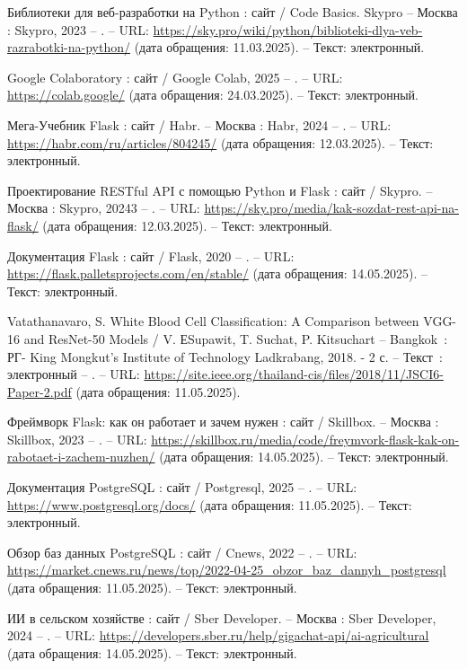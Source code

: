 \begin{thebibliography}{9}
	 Библиотеки для веб-разработки на Python : сайт / Code Basics. Skypro – Москва : Skypro, 2023 – . – URL: \url{https://sky.pro/wiki/python/biblioteki-dlya-veb-razrabotki-na-python/} (дата обращения: 11.03.2025). – Текст: электронный.
	
	 Google Colaboratory : сайт / Google Colab, 2025 – . – URL: \url{https://colab.google/} (дата обращения: 24.03.2025). – Текст: электронный.

	 Мега-Учебник Flask : сайт / Habr. – Москва : Habr, 2024 – . – URL: \url{https://habr.com/ru/articles/804245/} (дата обращения: 12.03.2025). – Текст: электронный.
	
	 Проектирование RESTful API с помощью Python и Flask : сайт / Skypro. – Москва : Skypro, 20243 – . – URL: \url{https://sky.pro/media/kak-sozdat-rest-api-na-flask/} (дата обращения: 12.03.2025). – Текст: электронный.
	
	 Документация Flask : сайт / Flask, 2020 – . – URL: \url{https://flask.palletsprojects.com/en/stable/} (дата обращения: 14.05.2025). – Текст: электронный.
	
	 Vatathanavaro, S. White Blood Cell Classification: A Comparison between VGG-16 and ResNet-50 Models / V. ЕSupawit, T. Suchat, P. Kitsuchart  – Bangkok~: РГ- King Mongkut’s Institute of Technology Ladkrabang, 2018. - 2 с. – Текст~: электронный – . – URL: \url{https://site.ieee.org/thailand-cis/files/2018/11/JSCI6-Paper-2.pdf} (дата обращения: 11.05.2025).
		
	 Фреймворк Flask: как он работает и зачем нужен : сайт / Skillbox. – Москва : Skillbox, 2023 – . – URL: \url{https://skillbox.ru/media/code/freymvork-flask-kak-on-rabotaet-i-zachem-nuzhen/} (дата обращения: 14.05.2025). – Текст: электронный.
	
	 Документация PostgreSQL : сайт / Postgresql, 2025 – . – URL: \url{https://www.postgresql.org/docs/} (дата обращения: 11.05.2025). – Текст: электронный.
	
	 Обзор баз данных PostgreSQL : сайт / Cnews, 2022 – . – URL: \url{https://market.cnews.ru/news/top/2022-04-25_obzor_baz_dannyh_postgresql} (дата обращения: 11.05.2025). – Текст: электронный.
	
	 ИИ в сельском хозяйстве : сайт / Sber Developer. – Москва : Sber Developer, 2024 – . – URL: \url{https://developers.sber.ru/help/gigachat-api/ai-agricultural} (дата обращения: 14.05.2025). – Текст: электронный.
	

\end{thebibliography}
